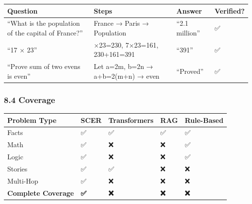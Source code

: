 \documentclass[
  11pt,
  a4paper,
]{article}
\begin{document}
\begin{longtable}[]{@{}
  >{\raggedright\arraybackslash}p{}
  >{\raggedright\arraybackslash}p{}
  >{\raggedright\arraybackslash}p{}
  >{\raggedright\arraybackslash}p{}@{}}
\toprule\noalign{}
\begin{minipage}[b]{\linewidth}\raggedright
Question
\end{minipage} & \begin{minipage}[b]{\linewidth}\raggedright
Steps
\end{minipage} & \begin{minipage}[b]{\linewidth}\raggedright
Answer
\end{minipage} & \begin{minipage}[b]{\linewidth}\raggedright
Verified?
\end{minipage} \\
\midrule\noalign{}
\endhead
\bottomrule\noalign{}
\endlastfoot
``What is the population of the capital of France?'' & France → Paris →
Population & ``2.1 million'' & ✅ \\
``17 × 23'' & 10×23=230, 7×23=161, 230+161=391 & ``391'' & ✅ \\
``Prove sum of two evens is even'' & Let a=2m, b=2n → a+b=2(m+n) → even
& ``Proved'' & ✅ \\
\end{longtable}

\subsubsection{8.4 Coverage}\label{coverage}

\begin{longtable}[]{@{}lllll@{}}
\toprule\noalign{}
Problem Type & SCER & Transformers & RAG & Rule-Based \\
\midrule\noalign{}
\endhead
\bottomrule\noalign{}
\endlastfoot
Facts & ✅ & ✅ & ✅ & ✅ \\
Math & ✅ & ❌ & ❌ & ✅ \\
Logic & ✅ & ❌ & ❌ & ✅ \\
Stories & ✅ & ✅ & ❌ & ❌ \\
Multi-Hop & ✅ & ❌ & ❌ & ❌ \\
\textbf{Complete Coverage} & \textbf{✅} & \textbf{❌} & \textbf{❌} &
\textbf{❌} \\
\end{longtable}
\end{document}

